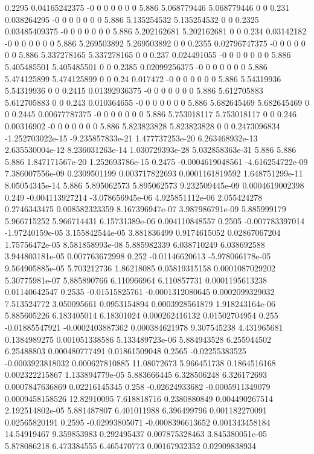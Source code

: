{0.2295 0.04165242375 -0 0 0 0 0 0 0 5.886 5.068779446 5.068779446 0 0
0.231 0.038264295 -0 0 0 0 0 0 0 5.886 5.135254532 5.135254532 0 0
0.2325 0.03485409375 -0 0 0 0 0 0 0 5.886 5.202162681 5.202162681 0 0
0.234 0.03142182 -0 0 0 0 0 0 0 5.886 5.269503892 5.269503892 0 0
0.2355 0.02796747375 -0 0 0 0 0 0 0 5.886 5.337278165 5.337278165 0 0
0.237 0.024491055 -0 0 0 0 0 0 0 5.886 5.405485501 5.405485501 0 0
0.2385 0.02099256375 -0 0 0 0 0 0 0 5.886 5.474125899 5.474125899 0 0
0.24 0.017472 -0 0 0 0 0 0 0 5.886 5.54319936 5.54319936 0 0
0.2415 0.01392936375 -0 0 0 0 0 0 0 5.886 5.612705883 5.612705883 0 0
0.243 0.010364655 -0 0 0 0 0 0 0 5.886 5.682645469 5.682645469 0 0
0.2445 0.00677787375 -0 0 0 0 0 0 0 5.886 5.753018117 5.753018117 0 0
0.246 0.00316902 -0 0 0 0 0 0 0 5.886 5.823823828 5.823823828 0 0
0.2473096834 -1.252703022e-15 -9.235857833e-21 1.477737253e-20 6.263468932e-13 2.635530004e-12 8.236031263e-14 1.030729393e-28 5.032858363e-31 5.886 5.886 5.886 1.847171567e-20 1.252693786e-15
0.2475 -0.0004619048561 -4.616254722e-09 7.386007556e-09 0.2309501199 0.003717822693 0.0001161819592 1.648751299e-11 8.05054345e-14 5.886 5.895062573 5.895062573 9.232509445e-09 0.0004619002398
0.249 -0.004113927214 -3.078656945e-06 4.925851112e-06 2.055424278 0.2746343475 0.008582323359 8.167396947e-07 3.987986791e-09 5.885999179 5.966715252 5.966714431 6.15731389e-06 0.004110848557
0.2505 -0.007783397014 -1.97240159e-05 3.155842544e-05 3.881836499 0.9174615052 0.02867067204 1.75756472e-05 8.581858993e-08 5.885982339 6.038710249 6.038692588 3.944803181e-05 0.007763672998
0.252 -0.01146620613 -5.978066178e-05 9.564905885e-05 5.703212736 1.86218085 0.05819315158 0.0001087029202 5.30775981e-07 5.885890766 6.110966964 6.110857731 0.0001195613238 0.01140642547
0.2535 -0.01515825761 -0.0001312080645 0.0002099329032 7.513524772 3.050095661 0.0953154894 0.0003928561879 1.918243164e-06 5.885605226 6.183405014 6.18301024 0.000262416132 0.01502704954
0.255 -0.01885547921 -0.0002403887362 0.000384621978 9.307545238 4.431965681 0.1384989275 0.001051338586 5.133489723e-06 5.884943528 6.255944502 6.25488803 0.000480777491 0.01861509048
0.2565 -0.02255383525 -0.0003923818032 0.000627810885 11.08072673 5.966451738 0.1864516168 0.002322215867 1.133894779e-05 5.883666445 6.328506248 6.326172693 0.0007847636869 0.02216145345
0.258 -0.02624933682 -0.0005911349079 0.0009458158526 12.82910095 7.618818716 0.2380880849 0.004490267514 2.192514802e-05 5.881487807 6.401011988 6.396499796 0.001182270091 0.02565820191
0.2595 -0.02993805071 -0.0008396613652 0.001343458184 14.54919467 9.359853983 0.292495437 0.007875328463 3.845380051e-05 5.878086218 6.473384555 6.465470773 0.00167932352 0.02909838934
}
